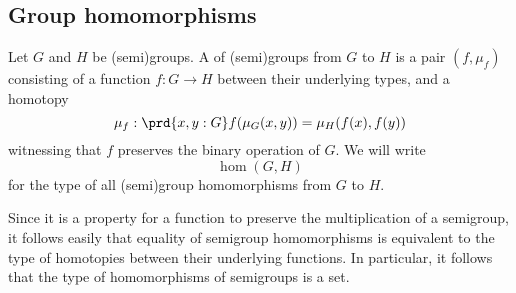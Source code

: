 \subsection{Group homomorphisms}

\begin{defn}
  Let $G$ and $H$ be (semi)groups. A  of (semi)groups from $G$ to $H$ is a pair $(f,\mu_f)$ consisting of a function $f:G\to H$ between their underlying types, and a homotopy
  \begin{equation*}
    \mu_f:\prd{x,y:G} f(\mu_G(x,y))=\mu_H(f(x),f(y))
  \end{equation*}
  witnessing that $f$ preserves the binary operation of $G$. We will write
  \begin{equation*}
    \hom(G,H)
  \end{equation*}
  for the type of all (semi)group homomorphisms from $G$ to $H$.
\end{defn}

\begin{rmk}\label{rmk:is-set-hom-semigroup}
  Since it is a property for a function to preserve the multiplication of a semigroup, it follows easily that equality of semigroup homomorphisms is equivalent to the type of homotopies between their underlying functions. In particular, it follows that the type of homomorphisms of semigroups is a set.
\end{rmk}

